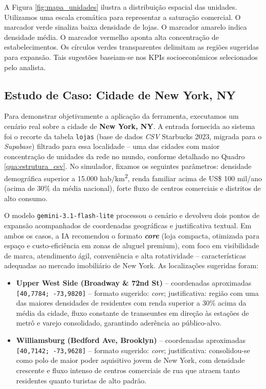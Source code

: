 A Figura \ref{fig:mapa_unidades} ilustra a distribuição espacial das unidades. Utilizamos uma escala cromática para representar a saturação comercial. O marcador verde sinaliza baixa densidade de lojas. O marcador amarelo indica densidade média. O marcador vermelho aponta alta concentração de estabelecimentos. Os círculos verdes transparentes delimitam as regiões sugeridas para expansão. Tais sugestões baseiam-se nos KPIs socioeconômicos selecionados pelo analista.

\subsection{\esp Estudo de Caso: Cidade de New York, NY}

Para demonstrar objetivamente a aplicação da ferramenta, executamos um cenário real sobre a cidade de \textbf{New York, NY}. A entrada fornecida ao sistema foi o recorte da tabela \texttt{lojas} (base de dados \textit{CSV} Starbucks 2023, migrada para o \textit{Supabase}) filtrado para essa localidade -- uma das cidades com maior concentração de unidades da rede no mundo, conforme detalhado no Quadro \ref{qua:estrutura_csv}. No simulador, fixamos os seguintes parâmetros: densidade demográfica superior a 15.000 hab/km\textsuperscript{2}, renda familiar acima de US\$ 100 mil/ano (acima de 30\% da média nacional), forte fluxo de centros comerciais e distritos de alto consumo.

O modelo \texttt{gemini-3.1-flash-lite} processou o cenário e devolveu dois pontos de expansão acompanhados de coordenadas geográficas e justificativa textual. Em ambos os casos, a IA recomendou o formato \textbf{\textit{core}} (loja compacta, otimizada para espaço e custo-eficiência em zonas de aluguel premium), com foco em visibilidade de marca, atendimento ágil, conveniência e alta rotatividade -- características adequadas ao mercado imobiliário de New York. As localizações sugeridas foram:

\begin{itemize}
    \item \textbf{Upper West Side (Broadway \& 72nd St)} -- coordenadas aproximadas \texttt{[40,7784; -73,9820]} -- formato sugerido: \textit{core}; justificativa: região com uma das maiores densidades de residentes com renda superior a 30\% acima da média da cidade, fluxo constante de transeuntes em direção às estações de metrô e varejo consolidado, garantindo aderência ao público-alvo.
    \item \textbf{Williamsburg (Bedford Ave, Brooklyn)} -- coordenadas aproximadas \texttt{[40,7142; -73,9628]} -- formato sugerido: \textit{core}; justificativa: consolidou-se como polo de maior poder aquisitivo jovem de New York, com densidade crescente e fluxo intenso de centros comerciais de rua que atraem tanto residentes quanto turistas de alto padrão.
\end{itemize}

